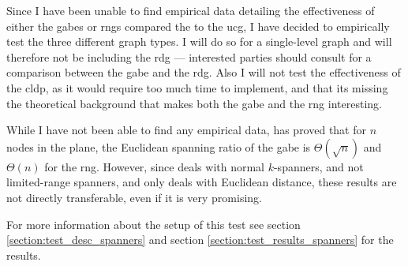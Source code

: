 Since I have been unable to find empirical data detailing the effectiveness of either the \acp{gabe} or \acp{rng} compared the to the \ac{ucg}, I have decided to empirically test the three different graph types. I will do so for a single-level graph and will therefore not be including the \ac{rdg} --- interested parties should consult \cite{GeoSpanners} for a comparison between the \ac{gabe} and the \ac{rdg}. Also I will not test the effectiveness of the \ac{cldp}, as it would require too much time to implement, and that its missing the theoretical background that makes both the \ac{gabe} and the \ac{rng} interesting.

While I have not been able to find any empirical data, \cite{spanningGG_RNG} has proved that for $n$ nodes in the plane, the Euclidean spanning ratio of the \ac{gabe} is $\Theta(\sqrt{n})$ and $\Theta(n)$ for the \ac{rng}. However, since \cite{spanningGG_RNG} deals with normal $k$-spanners, and not limited-range spanners, and only deals with Euclidean distance, these results are not directly transferable, even if it is very promising. 

For more information about the setup of this test see section \ref{section:test_desc_spanners} and section \ref{section:test_results_spanners} for the results.
